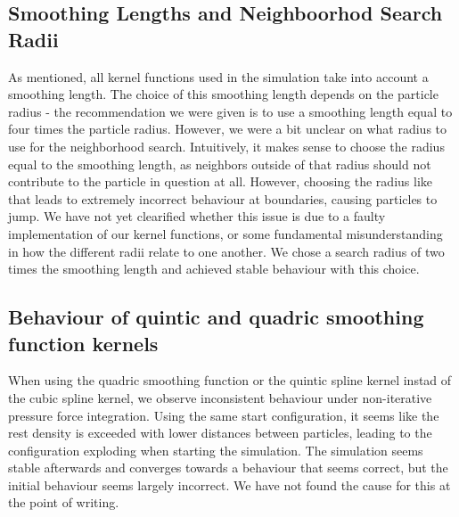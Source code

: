 \documentclass{ACGSeminar}
\begin{document}
\subsection{Smoothing Lengths and Neighboorhod Search Radii}
As mentioned, all kernel functions used in the simulation take into account a smoothing length. The choice of this smoothing length depends on the particle radius - the recommendation we were given is to use a smoothing length equal to four times the particle radius. However, we were a bit unclear on what radius to use for the neighborhood search. 
Intuitively, it makes sense to choose the radius equal to the smoothing length, as neighbors outside of that radius should not contribute to the particle in question at all. However, choosing the radius like that leads to extremely incorrect behaviour at boundaries, causing particles to jump. We have not yet clearified whether this issue is due to a faulty implementation of our kernel functions, or some fundamental misunderstanding in how the different radii relate to one another. We chose a search radius of two times the smoothing length and achieved stable behaviour with this choice.

\subsection{Behaviour of quintic and quadric smoothing function kernels}

When using the quadric smoothing function or the quintic spline kernel instad of the cubic spline kernel, we observe inconsistent behaviour under non-iterative pressure force integration. Using the same start configuration, it seems like the rest density is exceeded with lower distances between particles, leading to the configuration exploding when starting the simulation. The simulation seems stable afterwards and converges towards a behaviour that seems correct, but the initial behaviour seems largely incorrect. We have not found the cause for this at the point of writing.




\printbibliography
\cleardoublepage
\end{document}
